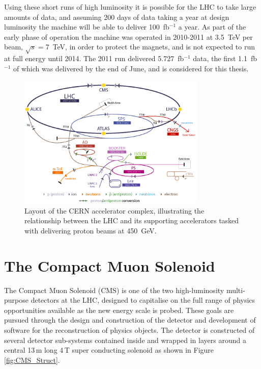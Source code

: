 Using these short runs of high luminosity it is possible for the LHC to take large amounts of data, and assuming 200 days of data taking a year  at design luminosity the machine will be able to deliver 100~fb$^{-1}$ a year. As part of the early phase of operation the machine was operated in 2010-2011 at 3.5~TeV per beam, $\sqrt{s} = $7~TeV, in order to protect the magnets, and is not expected to run at full energy until 2014. The 2011 run delivered 5.727~fb$^{-1}$ data, the first 1.1~fb$^{-1}$ of which was delivered by the end of June, and is considered for this thesis.

\begin{figure}[htbp]
\centering
\includegraphics[width=0.8\textwidth]{Figures/Detector/injection}
\caption{Layout of the CERN accelerator complex, illustrating the relationship between the LHC and its supporting accelerators tasked with delivering proton beams at 450~GeV.}
\label{fig:LHCinject}
\end{figure}



\section{The Compact Muon Solenoid}

The Compact Muon Solenoid (CMS) is one of the two high-luminosity multi-purpose detectors at the LHC, designed to capitalise on the full range of physics opportunities available as the new energy scale is probed. These goals are pursued through the design and construction of the detector and development of software for the reconstruction of physics objects. The detector is constructed of several detector sub-systems contained inside and wrapped in layers around a central 13\,m long 4\,T super conducting solenoid as shown in Figure \ref{fig:CMS_Struct}. 

